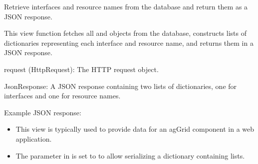 \documentclass[letterpaper,10pt,english]{sphinxmanual}
\begin{document}

\begin{fulllineitems}
\label{\detokenize{app:app.views.get_infos_interfaces}}
\pysigstartsignatures
{}
\pysigstopsignatures
\sphinxAtStartPar
Retrieve interfaces and resource names from the database and return them as a JSON response.

\sphinxAtStartPar
This view function fetches all  and  objects from the database, 
constructs lists of dictionaries representing each interface and resource name, and returns 
them in a JSON response.
\begin{description}
\sphinxAtStartPar
request (HttpRequest): The HTTP request object.

\sphinxAtStartPar
JsonResponse: A JSON response containing two lists of dictionaries, one for interfaces 
and one for resource names.

\sphinxAtStartPar
Example JSON response:

\begin{sphinxVerbatim}[commandchars=\\\{\}]
\PYG{p}{[}
\PYG{p}{],}
\PYG{p}{[}
\PYG{p}{]}
\PYG{p}{]}
\end{sphinxVerbatim}

\begin{itemize}
\item {} 
\sphinxAtStartPar
This view is typically used to provide data for an ag\sphinxhyphen{}Grid component in a web application.

\item {} 
\sphinxAtStartPar
The  parameter in  is set to  to allow serializing a dictionary containing lists.

\end{itemize}

\end{description}

\end{fulllineitems}
\end{document}
